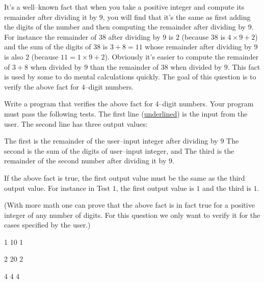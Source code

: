It's a well--known fact that when you take a positive integer and compute its remainder after dividing it by $9$, you will find that it's the same as first adding the digits of the number and then computing the remainder after dividing by $9$. For instance the remainder of $38$ after dividing by $9$ is $2$ (because $38$ is $4 \times 9 + 2$) and the sum of the digits of $38$ is $3 + 8 = 11$ whose remainder after dividing by $9$ is also $2$ (because $11 = 1 \times 9 + 2$). Obviously it's easier to compute the remainder of $3 + 8$ when divided by $9$ than the remainder of $38$ when divided by $9$. This fact is used by some to do mental calculations quickly. The goal of this question is to verify the above fact for $4$--digit numbers.

Write a program that verifies the above fact for $4$--digit numbers. Your program must pass the following tests. The first line (\underline{underlined}) is the input from the user. The second line has three output values: 
\begin{tightlist}
\li The first is the remainder of the user--input integer after dividing by $9$
\li The second is the sum of the digits of user--input integer, and 
\li The third is the remainder of the second number after dividing it by $9$. 
\end{tightlist}
If the above fact is true, the first output value must be the same as the third output value. For instance in Test $1$, the first output value is $1$ and the third is $1$.

(With more math one can prove that the above fact is in fact true for a positive integer of any number of digits. For this question we only want to verify it for the cases specified by the user.)

\resett
\nextt
\begin{console}[commandchars=\\\{\}]
1 10 1
\end{console}

\nextt
\begin{console}[commandchars=\\\{\}]
2 20 2
\end{console}

\nextt
\begin{console}[commandchars=\\\{\}]
4 4 4
\end{console}
